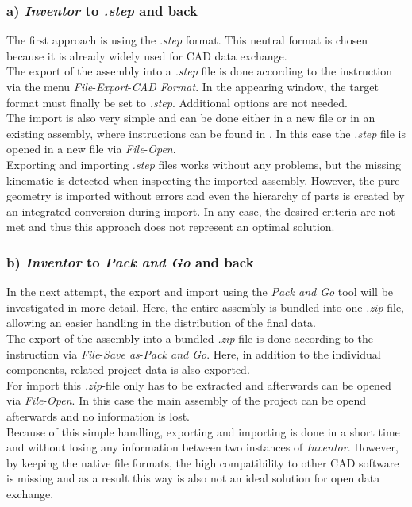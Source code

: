 \subsubsection{a) \textit{Inventor} to \textit{.step} and back}
    The first approach is using the \textit{.step} format. This neutral format is chosen because it is already widely used for CAD data exchange. \\
    The export of the assembly into a \textit{.step} file is done according to the instruction \cite{InventorAnleitungExportStep} via the menu \textit{File}-\textit{Export}-\textit{CAD Format}. In the appearing window, the target format must finally be set to \textit{.step}. Additional options are not needed. \\
    The import is also very simple and can be done either in a new file or in an existing assembly, where instructions can be found in \cite{InventorAnleitungImportStep}. In this case the \textit{.step} file is opened in a new file via \textit{File}-\textit{Open}. \\
    Exporting and importing \textit{.step} files works without any problems, but the missing kinematic is detected when inspecting the imported assembly. However, the pure geometry is imported without errors and even the hierarchy of parts is created by an integrated conversion during import. In any case, the desired criteria are not met and thus this approach does not represent an optimal solution.
    
\subsubsection{b) \textit{Inventor} to \textit{Pack and Go} and back}
    In the next attempt, the export and import using the \textit{Pack and Go} tool will be investigated in more detail. Here, the entire assembly is bundled into one \textit{.zip} file, allowing an easier handling in the distribution of the final data. \\
    The export of the assembly into a bundled \textit{.zip} file is done according to the instruction \cite{InventorAnleitungExportPackAndGo} via \textit{File}-\textit{Save as}-\textit{Pack and Go}. Here, in addition to the individual components, related project data is also exported.   \\
    For import this \textit{.zip}-file only has to be extracted and afterwards can be opened via \textit{File}-\textit{Open}. In this case the main assembly of the project can be opend afterwards and no information is lost.  \\
    Because of this simple handling, exporting and importing is done in a short time and without losing any information between two instances of \textit{Inventor}. However, by keeping the native file formats, the high compatibility to other CAD software is missing and as a result this way is also not an ideal solution for open data exchange. 
    
